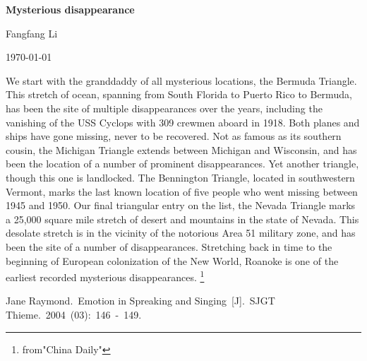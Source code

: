 \documentclass{article}
\begin{document}
\begin{center}
{\bfseries \LARGE Mysterious disappearance}
\end{center}
\begin{center}
Fangfang Li
\end{center}
\begin{center}
\today
\end{center}
\par We start with the granddaddy of all mysterious locations, the Bermuda Triangle. This stretch of ocean, spanning from South Florida to Puerto Rico to Bermuda, has been the site of multiple disappearances over the years, including the vanishing of the USS Cyclops with 309 crewmen aboard in 1918. Both planes and ships have gone missing, never to be recovered. Not as famous as its southern cousin, the Michigan Triangle extends between Michigan and Wisconsin, and has been the location of a number of prominent disappearances. Yet another triangle, though this one is landlocked. The Bennington Triangle, located in southwestern Vermont, marks the last known location of five people who went missing between 1945 and 1950. Our final triangular entry on the list, the Nevada Triangle marks a 25,000 square mile stretch of desert and mountains in the state of Nevada. This desolate stretch is in the vicinity of the notorious Area 51 military zone, and has been the site of a number of disappearances. Stretching back in time to the beginning of European colonization of the New World, Roanoke is one of the earliest recorded mysterious disappearances.
\footnote{from"China Daily"}
\begin{thebibliography}{99}
 Jane Raymond.~Emotion in Spreaking and Singing~[J].~SJGT Thieme.~2004~(03):~146~-~149.
\end{thebibliography}
\end{document}
